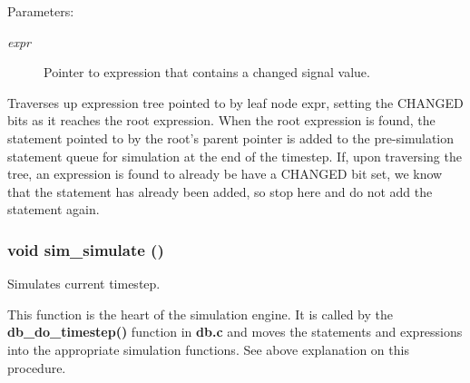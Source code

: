 \begin{Desc}
\item[Parameters:]
\begin{description}
\item[{\em expr}]Pointer to expression that contains a changed signal value.\end{description}
\end{Desc}
Traverses up expression tree pointed to by leaf node expr, setting the CHANGED bits as it reaches the root expression. When the root expression is found, the statement pointed to by the root's parent pointer is added to the pre-simulation statement queue for simulation at the end of the timestep. If, upon traversing the tree, an expression is found to already be have a CHANGED bit set, we know that the statement has already been added, so stop here and do not add the statement again. 
\subsubsection{\setlength{\rightskip}{0pt plus 5cm}void sim\_\-simulate ()}\label{sim_8h_a3}


Simulates current timestep.

This function is the heart of the simulation engine. It is called by the {\bf db\_\-do\_\-timestep()} function in {\bf db.c} and moves the statements and expressions into the appropriate simulation functions. See above explanation on this procedure. 